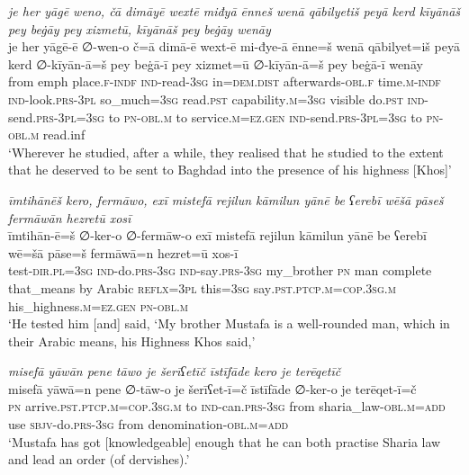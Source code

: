 \ea \label{ŽP.80}
\textit{je her yāgē weno, čā dimāyē wextē miđyā ēnneš wenā qābilyetiš peyā kerd kīyānāš pey beġāy pey xizmetū, kīyānāš pey beġāy wenāy} \\ 
\gll je her yāgē-ē ∅-wen-o č=ā dimā-ē wext-ē mi-đye-ā ēnne=š wenā qābilyet=iš peyā kerd ∅-kīyān-ā=š pey beġā-ī pey xizmet=ū ∅-kīyān-ā=š pey beġā-ī wenāy \\ 
 from emph place\textsc{.f}\textsc{-indf} \textsc{ind-}read\textsc{-3sg} in=\textsc{dem.dist} afterwards\textsc{-obl}\textsc{.f} time\textsc{.m}\textsc{-indf} \textsc{ind-}look\textsc{.prs}\textsc{-3pl} so\_much\textsc{=3sg} read\textsc{.pst} capability\textsc{.m}\textsc{=3sg} visible do\textsc{.pst} \textsc{ind-}send\textsc{.prs}\textsc{-3pl}\textsc{=3sg} to \textsc{pn}\textsc{-obl}\textsc{.m} to service\textsc{.m}\textsc{\textsc{=ez.gen}} \textsc{ind-}send\textsc{.prs}\textsc{-3pl}\textsc{=3sg} to \textsc{pn}\textsc{-obl}\textsc{.m} read.inf \\ 
\glt `Wherever he studied, after a while, they realised that he studied to the extent that he deserved to be sent to Baghdad into the presence of his highness [Khos]'
\z 
 
\ea \label{ŽP.83}
\textit{īmtihānēš kero, fermāwo, exī mistefā rejilun kāmilun yānē be ʕerebī wēšā pāseš fermāwān hezretū xosī} \\ 
\gll īmtihān-ē=š ∅-ker-o ∅-fermāw-o exī mistefā rejilun kāmilun yānē be ʕerebī wē=šā pāse=š fermāwā=n hezret=ū xos-ī \\ 
 test\textsc{-dir}\textsc{.pl}\textsc{=3sg} \textsc{ind-}do\textsc{.prs}\textsc{-3sg} \textsc{ind-}say\textsc{.prs}\textsc{-3sg} my\_brother \textsc{pn} man complete that\_means by Arabic \textsc{reflx}\textsc{=3pl} this\textsc{=3sg} say\textsc{.pst}\textsc{.ptcp}\textsc{.m}\textsc{=cop}\textsc{.3sg}\textsc{.m} his\_highness\textsc{.m}\textsc{\textsc{=ez.gen}} \textsc{pn}\textsc{-obl}\textsc{.m} \\ 
\glt `He tested him [and] said, ‘My brother Mustafa is a well-rounded man, which in their Arabic means, his Highness Khos said,'
\z 
 
\ea \label{ŽP.84}
\textit{misefā yāwān pene tāwo je šerīʕetīč īstīfāde kero je terēqetīč} \\ 
\gll misefā yāwā=n pene ∅-tāw-o je šerīʕet-ī=č īstīfāde ∅-ker-o je terēqet-ī=č \\ 
 \textsc{pn} arrive\textsc{.pst}\textsc{.ptcp}\textsc{.m}\textsc{=cop}\textsc{.3sg}\textsc{.m} to \textsc{ind-}can\textsc{.prs}\textsc{-3sg} from sharia\_law\textsc{-obl}\textsc{.m}\textsc{=add} use \textsc{sbjv-}do\textsc{.prs}\textsc{-3sg} from denomination\textsc{-obl}\textsc{.m}\textsc{=add} \\ 
\glt `Mustafa has got [knowledgeable] enough that he can both practise Sharia law and lead an order (of dervishes).'
\z 
 
